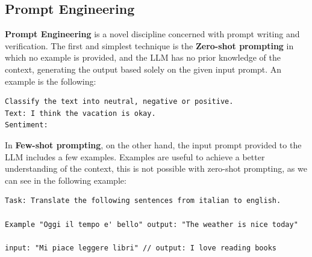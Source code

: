 
\subsection{Prompt Engineering}
\textbf{Prompt Engineering} is a novel discipline concerned with prompt writing and verification.
The first and simplest technique is the \textbf{Zero-shot prompting} in which no example is provided, and the LLM has no prior knowledge of the context, generating the output based solely on the given input prompt.
An example is the following: 
\begin{lstlisting}
Classify the text into neutral, negative or positive. 
Text: I think the vacation is okay.
Sentiment:   
\end{lstlisting}
In \textbf{Few-shot prompting}, on the other hand, the input prompt provided to the LLM includes a few examples. Examples are useful to achieve a better understanding of the context, this is not possible with zero-shot prompting, as we can see in the following example:
\begin{lstlisting}
Task: Translate the following sentences from italian to english.

Example "Oggi il tempo e' bello" output: "The weather is nice today"

input: "Mi piace leggere libri" // output: I love reading books
\end{lstlisting}

